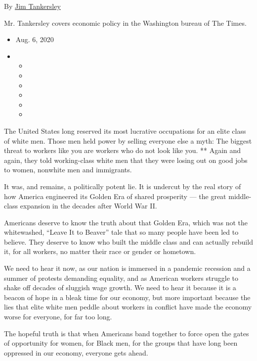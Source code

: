 By \href{https://www.nytimes.com/by/jim-tankersley}{Jim Tankersley}

Mr. Tankersley covers economic policy in the Washington bureau of The
Times.

\begin{itemize}
\item
  Aug. 6, 2020
\item
  \begin{itemize}
  \item
  \item
  \item
  \item
  \item
  \item
  \end{itemize}
\end{itemize}

The United States long reserved its most lucrative occupations for an
elite class of white men. Those men held power by selling everyone else
a myth: The biggest threat to workers like you are workers who do not
look like you. ** Again and again, they told working-class white men
that they were losing out on good jobs to women, nonwhite men and
immigrants.

It was, and remains, a politically potent lie. It is undercut by the
real story of how America engineered its Golden Era of shared prosperity
--- the great middle-class expansion in the decades after World War II.

Americans deserve to know the truth about that Golden Era, which was not
the whitewashed, ``Leave It to Beaver'' tale that so many people have
been led to believe. They deserve to know who built the middle class and
can actually rebuild it, for all workers, no matter their race or gender
or hometown.

We need to hear it now, as our nation is immersed in a pandemic
recession and a summer of protests demanding equality, and as American
workers struggle to shake off decades of sluggish wage growth. We need
to hear it because it is a beacon of hope in a bleak time for our
economy, but more important because the lies that elite white men peddle
about workers in conflict have made the economy worse for everyone, for
far too long.

The hopeful truth is that when Americans band together to force open the
gates of opportunity for women, for Black men, for the groups that have
long been oppressed in our economy, everyone gets ahead.


